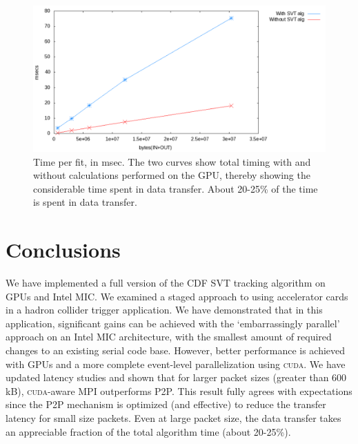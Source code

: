 \documentclass[journal]{IEEEtran}
\begin{document}
\begin{figure}[!t]
  \centering
  \includegraphics[width=0.85\linewidth]{figures/cudaware}
  \caption{Time per fit, in msec. The two curves show total timing
    with and without calculations performed on the GPU, thereby
    showing the considerable time spent in data transfer. About
    20-25\% of the time is spent in data transfer.}
  \label{fig:transferOnly}
\end{figure}



\section{Conclusions}
We have implemented a full version of the CDF SVT tracking algorithm
on GPUs and Intel MIC. We examined a staged approach to using
accelerator cards in a hadron collider trigger application. We have
demonstrated that in this application, significant gains can be
achieved with the `embarrassingly parallel' approach on an Intel MIC
architecture, with the smallest amount of required changes to an
existing serial code base. However, better performance is achieved
with GPUs and a more complete event-level parallelization using
\textsc{cuda}.  We have updated latency studies and shown that for larger packet sizes 
(greater than 600 kB), \textsc{cuda}-aware MPI outperforms P2P. This result fully agrees with expectations 
since the P2P mechanism is optimized (and effective) to reduce the transfer latency for 
small size packets.
Even at large packet
size, the data transfer takes an appreciable fraction of the total
algorithm time (about 20-25\%).

%
\end{document}
